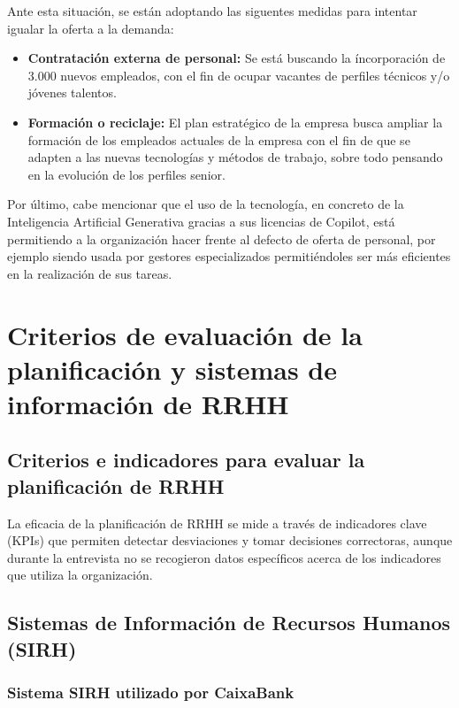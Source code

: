 \vspace{0.5cm}
Ante esta situación, se están adoptando las siguentes medidas para intentar igualar la oferta a la demanda:

\begin{itemize}
  \item \textbf{Contratación externa de personal:} Se está buscando la íncorporación de 3.000 nuevos empleados, con el fin de ocupar vacantes de perfiles técnicos y/o jóvenes talentos.
  \item \textbf{Formación o reciclaje:} El plan estratégico de la empresa busca ampliar la formación de los empleados actuales de la empresa con el fin de que se adapten a las nuevas tecnologías y métodos de trabajo, sobre todo pensando en la evolución de los perfiles senior.
\end{itemize}

Por último, cabe mencionar que el uso de la tecnología, en concreto de la Inteligencia Artificial Generativa gracias a sus licencias de Copilot, está permitiendo a la organización hacer frente al defecto de oferta de personal, por ejemplo siendo usada por gestores especializados permitiéndoles ser más eficientes en la realización de sus tareas.


\section{Criterios de evaluación de la planificación y sistemas de información de RRHH}

\subsection{Criterios e indicadores para evaluar la planificación de RRHH}

La eficacia de la planificación de RRHH se mide a través de indicadores clave (KPIs) que permiten detectar desviaciones y tomar decisiones correctoras, aunque durante la entrevista no se recogieron datos específicos acerca de los indicadores que utiliza la organización.

\subsection{Sistemas de Información de Recursos Humanos (SIRH)}

\subsubsection{Sistema SIRH utilizado por CaixaBank}

